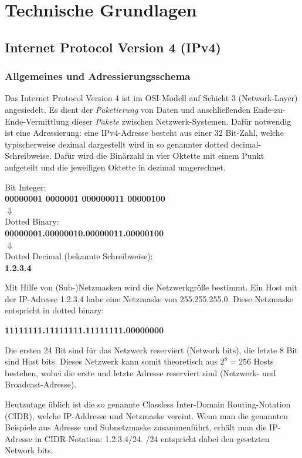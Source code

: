 \chapter{Technische Grundlagen} \label{Technische_Grundlagen}

\section{Internet Protocol Version 4 (IPv4)} \label{ipv4}
\subsection{Allgemeines und Adressierungsschema}
Das Internet Protocol Version 4 ist im OSI-Modell auf Schicht 3 (Network-Layer) angesiedelt\cite{itu1994}. Es dient der \textit{Paketierung} von Daten und anschließenden Ende-zu-Ende-Vermittlung dieser \textit{Pakete} zwischen Netzwerk-Systemen. Dafür notwendig ist eine Adressierung: eine IPv4-Adresse besteht aus einer 32 Bit-Zahl, welche typischerweise dezimal dargestellt wird in so genannter \glqq dotted decimal\grqq{}-Schreibweise. Dafür wird die Binärzahl in vier Oktette mit einem Punkt aufgeteilt und die jeweiligen Oktette in dezimal umgerechnet.

{ Bit Integer:\\
\textbf{00000001 0000001 000000011 00000100}\\
$\Downarrow$\\
\glqq Dotted Binary\grqq{}:\\
\textbf{00000001.00000010.00000011.00000100}\\
$\Downarrow$\\
Dotted Decimal (bekannte Schreibweise):\\
{\textbf{1.2.3.4}}\par}

Mit Hilfe von (Sub-)Netzmasken wird die Netzwerkgröße bestimmt. Ein Host mit der IP-Adresse 1.2.3.4 habe eine Netzmaske von 255.255.255.0. Diese Netzmaske entspricht in dotted binary:

{\centering\textbf{11111111.11111111.11111111.00000000}\par}

Die ersten 24 Bit sind für das Netzwerk reserviert (Network bits), die letzte 8 Bit sind Host bits. Dieses Netzwerk kann somit theoretisch aus $2^8 = 256$ Hosts bestehen, wobei die erste und letzte Adresse reserviert sind (Netzwerk- und Broadcast-Adresse).

Heutzutage üblich ist die so genannte Classless Inter-Domain Routing-Notation (CIDR), welche IP-Addresse und Netzmaske vereint. Wenn man die genannten Beispiele aus Adresse und Subnetzmaske zusammenführt, erhält man die IP-Adresse in CIDR-Notation: 1.2.3.4/24. /24 entspricht dabei den gesetzten Network bits.

